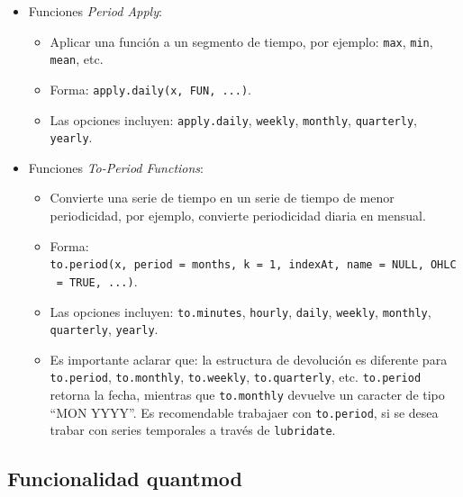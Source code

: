 \documentclass[
]{book}
\newenvironment{Shaded}{\begin{snugshade}}{\end{snugshade}}
\newcommand{\FunctionTok}[1]{\textcolor[rgb]{0.13,0.29,0.53}{\textbf{#1}}}
\newcommand{\NormalTok}[1]{#1}
\newcommand{\SpecialCharTok}[1]{\textcolor[rgb]{0.81,0.36,0.00}{\textbf{#1}}}
\providecommand{\tightlist}{%
  \setlength{\itemsep}{0pt}\setlength{\parskip}{0pt}}
\begin{document}
\begin{itemize}
\tightlist
\item
  Funciones \emph{Period Apply}:

  \begin{itemize}
  \tightlist
  \item
    Aplicar una función a un segmento de tiempo, por ejemplo: \texttt{max}, \texttt{min}, \texttt{mean}, etc.
  \item
    Forma: \texttt{apply.daily(x,\ FUN,\ ...)}.
  \item
    Las opciones incluyen: \texttt{apply.daily}, \texttt{weekly}, \texttt{monthly}, \texttt{quarterly}, \texttt{yearly}.
  \end{itemize}
\item
  Funciones \emph{To-Period Functions}:

  \begin{itemize}
  \tightlist
  \item
    Convierte una serie de tiempo en un serie de tiempo de menor periodicidad, por ejemplo, convierte periodicidad diaria en mensual.
  \item
    Forma: \texttt{to.period(x,\ period\ =\ \textquotesingle{}months\textquotesingle{},\ k\ =\ 1,\ indexAt,\ name\ =\ NULL,\ OHLC\ =\ TRUE,\ ...)}.
  \item
    Las opciones incluyen: \texttt{to.minutes}, \texttt{hourly}, \texttt{daily}, \texttt{weekly}, \texttt{monthly}, \texttt{quarterly}, \texttt{yearly}.
  \item
    Es importante aclarar que: la estructura de devolución es diferente para \texttt{to.period}, \texttt{to.monthly}, \texttt{to.weekly}, \texttt{to.quarterly}, etc. \texttt{to.period} retorna la fecha, mientras que \texttt{to.monthly} devuelve un caracter de tipo ``MON YYYY''. Es recomendable trabajaer con \texttt{to.period}, si se desea trabar con series temporales a través de \texttt{lubridate}.
  \end{itemize}
\end{itemize}

\hypertarget{funcionalidad-quantmod}{%
\subsection{Funcionalidad quantmod}\label{funcionalidad-quantmod}}

\begin{Shaded}
\end{Shaded}
\end{document}
